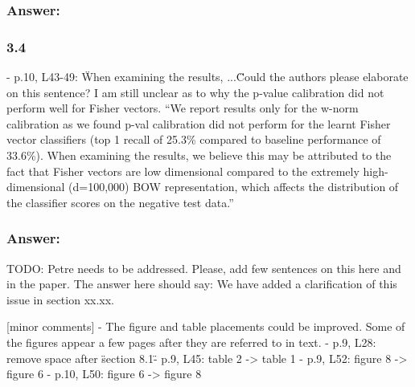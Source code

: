 \documentclass[a4paper,12pt]{article}
\begin{document}
\subsubsection*{Answer:}

\subsubsection*{3.4}
- p.10, L43-49: \"When examining the results, ...\" Could the authors please elaborate on this sentence? I am still unclear as to why the p-value calibration did not perform well for Fisher vectors.
“We report results only for the w-norm calibration as we found p-val calibration did not perform for the learnt Fisher vector classifiers (top 1 recall of 25.3\% compared to baseline performance of 33.6\%). When examining the results, we believe this may be attributed to the fact that Fisher vectors are low dimensional compared to the extremely high-dimensional (d=100,000) BOW representation, which affects the distribution of the classifier scores on the negative test data.”

\subsubsection*{Answer:}
TODO: Petre needs to be addressed. Please, add few sentences on this here and in the paper. The answer here should say: We have added a clarification of this issue in section xx.xx.  

[minor comments]
- The figure and table placements could be improved. Some of the figures appear a few pages after they are referred to in text.
- p.9, L28: remove space after \"section 8.1\"
- p.9, L45: table 2 -> table 1
- p.9, L52: figure 8 -> figure 6 - p.10, L50: figure 6 -> figure 8
\end{document}
